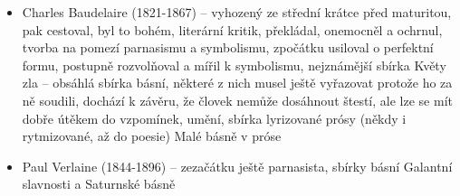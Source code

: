 \documentclass{article}
\begin{document}
\begin{itemize}
  \begin{itemize}
    \item Charles Baudelaire (1821-1867) -- vyhozený ze střední krátce před maturitou, pak cestoval, byl to bohém, literární kritik, překládal, onemocněl a ochrnul, tvorba na pomezí parnasismu a symbolismu, zpočátku usiloval o perfektní formu, postupně rozvolňoval a mířil k symbolismu, nejznámější sbírka Květy zla -- obsáhlá sbírka básní, některé z nich musel ještě vyřazovat protože ho za ně soudili, dochází k závěru, že človek nemůže dosáhnout štestí, ale lze se mít dobře útěkem do vzpomínek, umění, sbírka lyrizované prósy (někdy i rytmizované, až do poesie) Malé básně v próse
    \item Paul Verlaine (1844-1896) -- zezačátku ještě parnasista, sbírky básní Galantní slavnosti a Saturnské básně
  \end{itemize}
\end{itemize}
\end{document}
